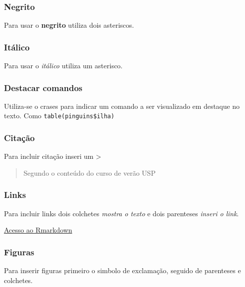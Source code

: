 \documentclass[
]{article}
\begin{document}
\hypertarget{negrito}{%
\subsubsection{Negrito}\label{negrito}}

Para usar o \textbf{negrito} utiliza dois asteriscos.

\hypertarget{ituxe1lico}{%
\subsubsection{Itálico}\label{ituxe1lico}}

Para usar o \emph{itálico} utiliza um asterisco.

\hypertarget{destacar-comandos}{%
\subsubsection{Destacar comandos}\label{destacar-comandos}}

Utiliza-se o crases para indicar um comando a ser visualizado em
destaque no texto. Como \texttt{table(pinguins\$ilha)}

\hypertarget{citauxe7uxe3o}{%
\subsubsection{Citação}\label{citauxe7uxe3o}}

Para incluir citação inseri um \textgreater{}

\begin{quote}
Segundo o conteúdo do curso de verão USP
\end{quote}

\hypertarget{links}{%
\subsubsection{Links}\label{links}}

Para incluir links dois colchetes \emph{mostra o texto} e dois
parenteses \emph{inseri o link}.

\href{https://rmarkdown.rstudio.com/}{Acesso ao Rmarkdown}

\hypertarget{figuras}{%
\subsubsection{Figuras}\label{figuras}}

Para inserir figuras primeiro o simbolo de exclamação, seguido de
parenteses e colchetes.
\end{document}
